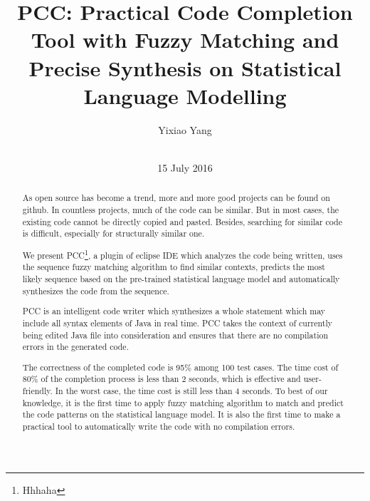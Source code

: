 \documentclass{sig-alternate-05-2015}
\begin{document}


\title{PCC: Practical Code Completion Tool with Fuzzy Matching and Precise Synthesis on Statistical Language Modelling}\vspace{-2cm}

\author{
\alignauthor
Yixiao Yang \\
        \\
}
\date{15 July 2016}
\maketitle
\begin{abstract}
As open source has become a trend, more and more good projects can be found on github. In countless projects, much of the code can be similar. But in most cases, the existing code cannot be directly copied and pasted. Besides, searching for similar code is difficult, especially for structurally similar one.


We present PCC\footnote{Hhhaha}, a plugin of eclipse IDE which analyzes the code being written, uses the sequence fuzzy matching algorithm to find similar contexts, predicts the most likely sequence based on the pre-trained statistical language model and automatically synthesizes the code from the sequence.

PCC is an intelligent code writer which synthesizes a whole statement which may include all syntax elements of Java in real time. PCC takes the context of currently being edited Java file into consideration and ensures that there are no compilation errors in the generated code.

The correctness of the completed code is 95\% among 100 test cases. The time cost of 80\% of the completion process is less than 2 seconds, which is effective and user-friendly. In the worst case, the time cost is still less than 4 seconds. To best of our knowledge, it is the first time to apply fuzzy matching algorithm to match and predict the code patterns on the statistical language model. It is also the first time to make a practical tool to automatically write the code with no compilation errors.
\end{abstract}
\end{document}
